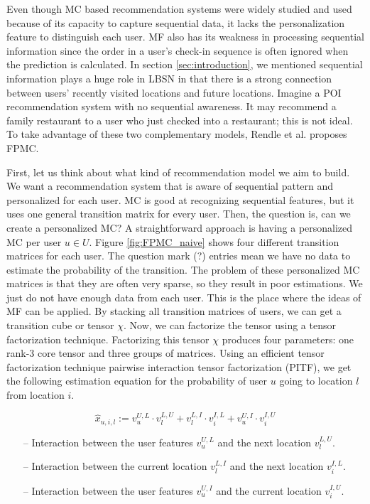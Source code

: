 \documentclass{sig-alternate}
\begin{document}
Even though MC based recommendation systems were widely studied and used because of 
its capacity to capture sequential data, it lacks the personalization feature to distinguish each user. 
MF also has its weakness in processing sequential information since the order in a user's check-in sequence 
is often ignored when the prediction is calculated.
In section \ref{sec:introduction}, we mentioned sequential information plays a huge role in LBSN 
in that there is a strong connection between users' recently visited locations and future locations. 
Imagine a POI recommendation system with no sequential awareness. 
It may recommend a family restaurant to a user who just checked into a restaurant; this is not ideal. 
To take advantage of these two complementary models, Rendle et al. \cite{Rendle:2010:FPM} proposes FPMC.

First, let us think about what kind of recommendation model we aim to build. 
We want a recommendation system that is aware of sequential pattern and personalized for each user.
MC is good at recognizing sequential features, but it uses one general transition matrix for every user. 
Then, the question is, can we create a personalized MC?
A straightforward approach is having a personalized MC per user $u \in U$. 
Figure \ref{fig:FPMC_naive} shows four different transition matrices for each user. 
The question mark (?) entries mean we have no data to estimate the probability of the transition. The problem of these personalized 
MC matrices is that they are often very sparse, so they result in poor estimations. We just do not have enough data from
each user. This is the place where the ideas of MF can be applied. By stacking all transition matrices of users, 
we can get a transition cube or tensor $\chi$. Now, we can factorize the tensor using a tensor factorization technique. 
Factorizing this tensor $\chi$ produces four parameters: one rank-3 core tensor and three groups of matrices. Using an efficient tensor 
factorization technique pairwise interaction tensor factorization (PITF), we get the following 
estimation equation for the probability of user $u$ going to location $l$ from location $i$. \cite{Rendle:2010:PIT}

\begin{equation}
	\hat{x}_{u,i,l} := v_u^{U,L} \cdot v_l^{L,U} + v_l^{L,I} \cdot v_i^{I,L} + v_u^{U,I} \cdot v_i^{I,U}
\label{eq:MF}
\end{equation}

\begin{itemize}
\item[--] Interaction between the user features $v_u^{U,L}$ and the next location $v_l^{L,U}$.
\item[--] Interaction between the current location $v_l^{L,I}$ and the next location $v_i^{I,L}$.
\item[--] Interaction between the user features $v_u^{U,I}$ and the current location $v_i^{I,U}$.
\end{itemize}
\end{document}
